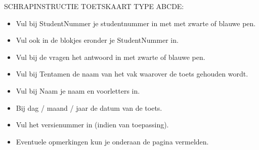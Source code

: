 \documentclass[a4paper,12pt,fleqn,dutch]{tisdexam}
\begin{document}

\makecoverpage

	\begin{minipage}[c]{0.979\linewidth}
	{\fontsize{11pt}{12pt}\selectfont\bfseries
	{\addtolength{\leftskip}{6mm} SCHRAPINSTRUCTIE TOETSKAART TYPE ABCDE: \par}
	\par}%

	{\fontsize{11pt}{12pt}\selectfont
		\begin{itemize}\itemsep-4pt
			\item Vul bij StudentNummer je studentnummer in met met zwarte of blauwe pen.
			\item Vul ook in de blokjes eronder je StudentNummer in.
			\item Vul bij de vragen het antwoord in met zwarte of blauwe pen.
			\item Vul bij Tentamen de naam van het vak waarover de toets gehouden wordt.
			\item Vul bij Naam je naam en voorletters in.
			\item Bij dag / maand / jaar de datum van de toets.
			\item Vul het versienummer in (indien van toepassing).
			\item Eventuele opmerkingen kun je onderaan de pagina vermelden.
		\end{itemize}
		\vskip 1.0cm
	\par}%
	\end{minipage}\hfill
\end{document}
